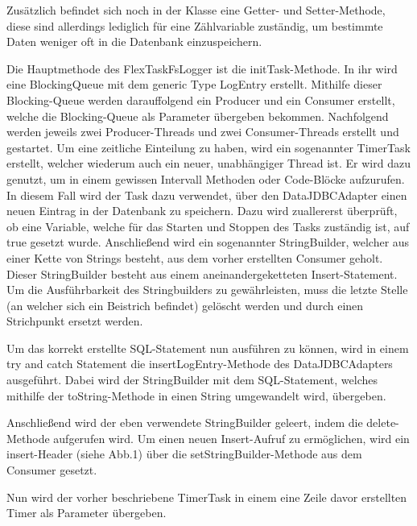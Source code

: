 Zusätzlich befindet sich noch in der Klasse eine Getter- und Setter-Methode, diese sind allerdings lediglich für eine Zählvariable zuständig, um bestimmte Daten weniger oft in die Datenbank einzuspeichern.

Die Hauptmethode des FlexTaskFsLogger ist die initTask-Methode. In ihr wird eine BlockingQueue mit dem generic Type LogEntry erstellt. Mithilfe dieser Blocking-Queue werden darauffolgend ein Producer und ein Consumer erstellt, welche die Blocking-Queue als Parameter übergeben bekommen. Nachfolgend werden jeweils zwei Producer-Threads und zwei Consumer-Threads erstellt und gestartet. Um eine zeitliche Einteilung zu haben, wird ein sogenannter TimerTask erstellt, welcher wiederum auch ein neuer, unabhängiger Thread ist. Er wird dazu genutzt, um in einem gewissen Intervall Methoden oder Code-Blöcke aufzurufen. In diesem Fall wird der Task dazu verwendet, über den DataJDBCAdapter einen neuen Eintrag in der Datenbank zu speichern. Dazu wird zuallererst überprüft, ob eine Variable, welche für das Starten und Stoppen des Tasks zuständig ist, auf true gesetzt wurde. Anschließend wird ein sogenannter StringBuilder, welcher aus einer Kette von Strings besteht, aus dem vorher erstellten Consumer geholt. Dieser StringBuilder besteht aus einem aneinandergeketteten Insert-Statement. Um die Ausführbarkeit des Stringbuilders zu gewährleisten, muss die letzte Stelle (an welcher sich ein Beistrich befindet) gelöscht werden und durch einen Strichpunkt ersetzt werden. 

Um das korrekt erstellte SQL-Statement nun ausführen zu können, wird in einem try and catch Statement die insertLogEntry-Methode des DataJDBCAdapters ausgeführt. Dabei wird der StringBuilder mit dem SQL-Statement, welches mithilfe der toString-Methode in einen String umgewandelt wird, übergeben. 

Anschließend wird der eben verwendete StringBuilder geleert, indem die delete-Methode aufgerufen wird. Um einen neuen Insert-Aufruf zu ermöglichen, wird ein insert-Header (siehe Abb.1) über die setStringBuilder-Methode aus dem Consumer gesetzt. 

Nun wird der vorher beschriebene TimerTask in einem eine Zeile davor erstellten Timer als Parameter übergeben.

